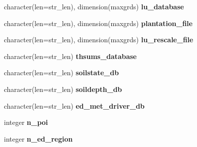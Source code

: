 \begin{DoxyCompactItemize}
\item 
\hypertarget{structename__coms_1_1ename__vars_a3fb91e3fdb87e79663119588ca1ae734}{
character(len=str\_\-len), dimension(maxgrds) {\bfseries lu\_\-database}}
\label{structename__coms_1_1ename__vars_a3fb91e3fdb87e79663119588ca1ae734}

\item 
\hypertarget{structename__coms_1_1ename__vars_af91e753f58bfbf557f1753585e6b708a}{
character(len=str\_\-len), dimension(maxgrds) {\bfseries plantation\_\-file}}
\label{structename__coms_1_1ename__vars_af91e753f58bfbf557f1753585e6b708a}

\item 
\hypertarget{structename__coms_1_1ename__vars_a60d1f9d75f3042414a5e1781400f4252}{
character(len=str\_\-len), dimension(maxgrds) {\bfseries lu\_\-rescale\_\-file}}
\label{structename__coms_1_1ename__vars_a60d1f9d75f3042414a5e1781400f4252}

\item 
\hypertarget{structename__coms_1_1ename__vars_a8a629b50c4a3d00b1eb1deea3b239a6d}{
character(len=str\_\-len) {\bfseries thsums\_\-database}}
\label{structename__coms_1_1ename__vars_a8a629b50c4a3d00b1eb1deea3b239a6d}

\item 
\hypertarget{structename__coms_1_1ename__vars_ab3b1aab371445e20968cec38fb70740b}{
character(len=str\_\-len) {\bfseries soilstate\_\-db}}
\label{structename__coms_1_1ename__vars_ab3b1aab371445e20968cec38fb70740b}

\item 
\hypertarget{structename__coms_1_1ename__vars_a7f495f9cd365ad7e341ee2bb4174715f}{
character(len=str\_\-len) {\bfseries soildepth\_\-db}}
\label{structename__coms_1_1ename__vars_a7f495f9cd365ad7e341ee2bb4174715f}

\item 
\hypertarget{structename__coms_1_1ename__vars_ab8a19cfd0805eb6cc59b1e4e9eda03f8}{
character(len=str\_\-len) {\bfseries ed\_\-met\_\-driver\_\-db}}
\label{structename__coms_1_1ename__vars_ab8a19cfd0805eb6cc59b1e4e9eda03f8}

\item 
\hypertarget{structename__coms_1_1ename__vars_afa96104dce8e3f44f3d792ff6ea5aa5d}{
integer {\bfseries n\_\-poi}}
\label{structename__coms_1_1ename__vars_afa96104dce8e3f44f3d792ff6ea5aa5d}

\item 
\hypertarget{structename__coms_1_1ename__vars_a0da37279c338a3a9c74a700f56ae9557}{
integer {\bfseries n\_\-ed\_\-region}}
\label{structename__coms_1_1ename__vars_a0da37279c338a3a9c74a700f56ae9557}


\end{DoxyCompactItemize}
